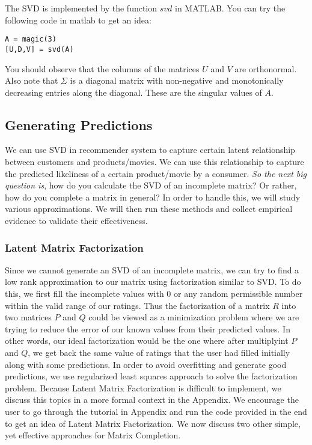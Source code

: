 The SVD is implemented by the function $svd$ in MATLAB. You can try the following code in matlab to get an idea:
\begin{verbatim}
A = magic(3)
[U,D,V] = svd(A)
\end{verbatim}

You should observe that the columns of the matrices $U$ and $V$ are orthonormal. Also note that $\Sigma$ is a diagonal matrix with non-negative and monotonically decreasing entries along the diagonal. These are the singular values of $A$.
  \subsection{Generating Predictions}
  We can use SVD in recommender system to capture certain latent relationship between customers and products/movies. We can use this relationship to capture the predicted likeliness of a certain product/movie by a consumer. \textit{So the next big question is}, how do you calculate the SVD of an incomplete matrix? Or rather, how do you complete a matrix in general? In order to handle this, we will study various approximations. We will then run these methods and collect empirical evidence to validate their effectiveness.
  \subsubsection{Latent Matrix Factorization}
  Since we cannot generate an SVD of an incomplete matrix, we can try to find a low rank approximation to our matrix using factorization similar to SVD. To do this, we first fill the incomplete values with 0 or any random permissible number within the valid range of our ratings. Thus the factorization of a matrix $R$ into two matrices $P$ and $Q$ could be viewed as a minimization problem where we are trying to reduce the error of our known values from their predicted values. In other words, our ideal factorization would be the one where after multiplyint $P$ and $Q$, we get back the same value of ratings that the user had filled initially along with some predictions. In order to avoid overfitting and generate good predictions, we use regularized least squares approach to solve the factorization problem. Because Latent Matrix Factorization is difficult to implement, we discuss this topics in a more formal context in the Appendix. We encourage the user to go through the tutorial in Appendix and run the code provided in the end to get an idea of Latent Matrix Factorization. We now discuss two other simple, yet effective approaches for Matrix Completion.
